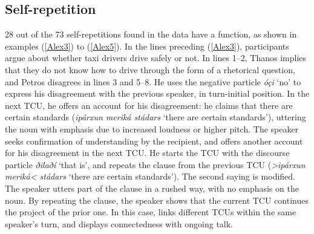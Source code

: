 \documentclass[output=paper]{LSP/langsci}
\begin{document}
\subsection{Self-repetition}
\label{Alself.repetition}
28 out of the 73 self-repetitions found in the data have a  function, as shown in examples (\ref{Alex3}) to (\ref{Alex5}).  In the lines preceding (\ref{Alex3}), participants argue about whether  taxi drivers drive safely or not. In lines 1--2, Thanos implies that they do not know how to drive through the form of a rhetorical question, and Petros disagrees in lines 3 and 5--8. He uses the negative particle \textit{óçi} `no' to express his disagreement with the previous speaker, in turn-initial position. In the next TCU, he offers an account for his disagreement: he claims that there are certain standards (\textit{ipárxun meriká stádars} `there are certain standards'), uttering the noun with emphasis due to increased loudness or higher pitch. The speaker seeks confirmation of understanding by the recipient, and offers another account for his disagreement in the next TCU. He starts the TCU with the discourse particle \textit{ðilaðí} `that is', and repeats the clause from the previous TCU (\textit{>ipárxun meriká< stádars} `there are certain standards'). The second saying is modified. The speaker utters part of the clause in a rushed way, with no emphasis on the noun. By repeating the clause, the speaker shows that the current TCU continues the project of the prior one. In this case,  links different TCUs within the same speaker’s turn, and displays connectedness with ongoing talk. 
\end{document}
